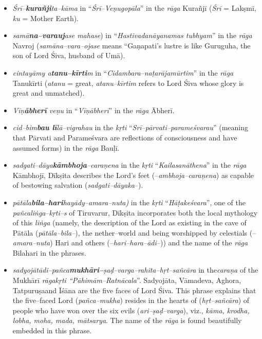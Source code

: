 \begin{itemize}
\itemsep=0pt
\item \textit{Śrī–\textbf{kurañji}ta–kāma} in “\textit{Śrī–Veṇugopāla}” in the \textit{rāga} Kurañjī (\textit{Śrī} = Lakṣmī, \textit{ku} = Mother Earth).

 \item \textit{samā\textbf{na–varauj}ase mahase}) in “\textit{Hastivadanāyanamas tubhyam}” in the \textit{rāga} Navroj (\textit{samāna–vara–ojase} means “Gaṇapati’s lustre is like Guruguha, the son of Lord Śiva, husband of Umā).

 \item \textit{cintayāmy a\textbf{tanu–kīrti}m} in “\textit{Cidambara–naṭarājamūrtim}” in the \textit{rāga} Tanukīrti (\textit{atanu} = great, \textit{atanu–kīrtim} refers to Lord Śiva whose glory is great and unmatched).

 \item \textit{Vīṇ\textbf{ābherī} veṇu} in “\textit{Vīṇābherī}” in the \textit{rāga} Ābherī.

 \item \textit{cid–bim\textbf{bau lī}lā–vigrahau} in the \textit{kṛti} “\textit{Srī–pārvati–parameśvarau}” (meaning that Pārvati and Parameśvara are reflections of consciousness and have assumed forms) in the \textit{rāga} Bauḷī.

 \item \textit{sadgati–dāya\textbf{kāmbhoja}–caraṇena} in the \textit{kṛti} “\textit{Kailasanāthena}” in the \textit{rāga} Kāmbhojī, Dīkṣita describes the Lord’s feet (–\textit{ambhoja–caraṇena}) as capable of bestowing salvation (\textit{sadgati–dāyaka}–).

 \item \textit{pātāla\textbf{bila–hari}hayādy–amara–nuta)} in the \textit{kṛti} “\textit{Hāṭakeśvara}”, one of the \textit{pañcaliṅga}–\textit{kṛti–s} of Tiruvarur, Dīkṣita incorporates both the local mythology of this \textit{liṅga} (namely, the description of the Lord as existing in the cave of Pātāla (\textit{pātāla–bila–}), the nether–world and being worshipped by celestials (–\textit{amara–nuta}) Hari and others (–\textit{hari–hara–ādi–})) and the name of the \textit{rāga} Bilahari in the phrases.

 \item \textit{sadyojātādi–pañca\textbf{mukhāri–}ṣaḍ–varga–rahita–hṛt–sañcāra} in the\break \textit{caraṇa} of the Mukhārī\textit{ rāgakṛti “Pāhimām–Ratnācala}”. Sadyojāta, Vāmadeva, Aghora, Tatpuruṣaand Īśāna are the five faces of Lord Śiva. This phrase explains that the five–faced Lord (\textit{pañca–mukha}) resides in the hearts of (\textit{hṛt–sañcāra}) of people who have won over the six evils (\textit{ari–ṣaḍ–varga}), viz., \textit{kāma, krodha, lobha, moha, mada, mātsarya}. The name of the \textit{rāga} is found beautifully embedded in this phrase.


\end{itemize}
